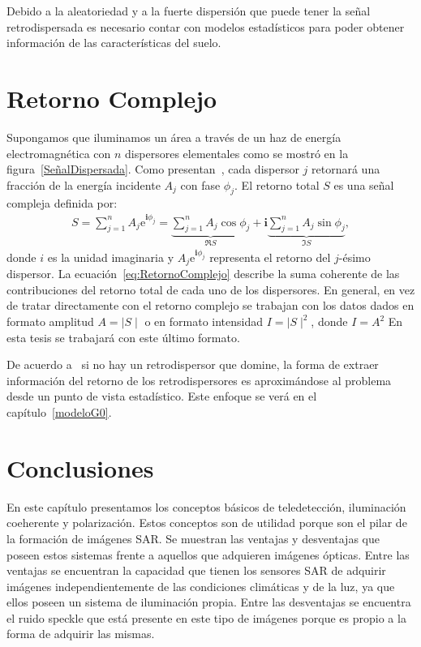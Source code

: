 Debido a la aleatoriedad y a la fuerte dispersión que puede tener la señal retrodispersada es necesario contar con modelos estadísticos para poder obtener información de las características del suelo.

\section{Retorno Complejo}
\label{RetornoComplejo}

Supongamos que iluminamos un área a través de un haz de energía electromagnética con $n$ dispersores elementales como se mostró en la figura~\ref{SeñalDispersada}. Como presentan~\citet{FreryLibro2019}, cada dispersor $j$ retornará una fracción de la energía incidente $A_j$ con fase $\phi_j$. El retorno total $S$ es una señal compleja definida por:
\begin{align}
S = \sum_{j=1}^{n} A_j \mathrm{e}^{\mathbf i \phi_j} = 
\underbrace{{\sum_{j=1}^{n} A_j \cos \phi_j}}_{\Re{S}} +\mathbf i \underbrace{ \sum_{j=1}^{n} A_j \sin \phi_j}_{\Im{S}}, 
\label{eq:RetornoComplejo}
\end{align}
donde $i$ es la unidad imaginaria y $A_j \mathrm{e}^{\mathbf i \phi_j}$ representa el retorno del $j$-ésimo dispersor. La ecuación~\eqref{eq:RetornoComplejo} describe la suma coherente de las contribuciones del retorno total de cada uno de los dispersores. En general, en vez de tratar directamente con el retorno complejo se trabajan con los datos dados en formato amplitud $A=\mid S \mid$ o  en formato intensidad $I=\mid S \mid^2$, donde $I=A^2$ En esta tesis se trabajará con este último formato.

De acuerdo a~\citet{Quegan1994} si no hay un retrodispersor que domine, la forma de extraer información del retorno de los retrodispersores es aproximándose al problema desde un punto de vista estadístico. Este enfoque se verá en el capítulo~\ref{modeloG0}.




\section{Conclusiones}

En este capítulo presentamos los conceptos básicos de teledetección, iluminación coeherente y polarización. Estos conceptos son de utilidad porque son el pilar de la formación de imágenes SAR. Se muestran las ventajas y desventajas que poseen estos sistemas frente a aquellos que adquieren imágenes ópticas. Entre las ventajas se encuentran la capacidad que tienen los sensores SAR de adquirir imágenes independientemente de las condiciones climáticas y de la luz, ya que ellos poseen un sistema de iluminación propia. Entre las desventajas se encuentra el ruido speckle que está presente en este tipo de imágenes porque es propio a la forma de adquirir las mismas. 

